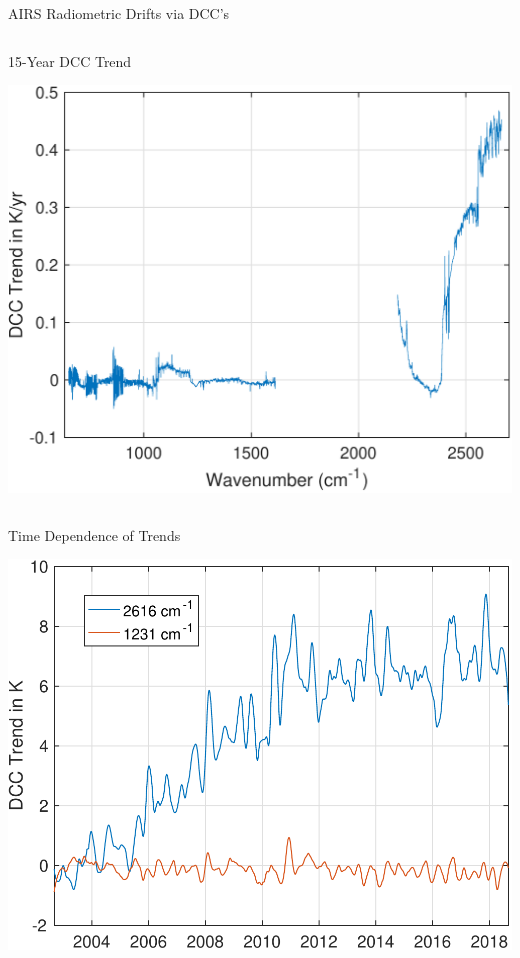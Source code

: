 \documentclass[10pt,t]{beamer}
\begin{document}
\begin{frame}[label={sec:org1248642}]{AIRS Radiometric Drifts via DCC's}
\begin{columns}
\begin{column}{0.5\columnwidth}
\begin{block}{\scriptsize 15-Year DCC Trend}
\vspace{-0.12in}
\begin{center}
\includegraphics[width=0.95\linewidth]{./Figs/Pdf/dcc_trend.pdf}
\end{center}
\end{block}
\end{column}
\end{columns}

\vspace{-0.25in}
\begin{columns}
\begin{column}{0.5\columnwidth}
\begin{block}{\scriptsize Time Dependence of Trends}
\vspace{-0.12in}
\begin{center}
\includegraphics[width=0.8\linewidth]{./Figs/Pdf/dcc_drift_vs_time_1231_2616.pdf}
\end{center}
\end{block}
\end{column}


\end{columns}
\end{frame}
\end{document}

